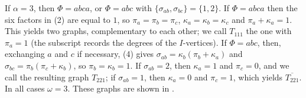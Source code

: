 \documentclass[11pt]{article}
\begin{document}
If $\alpha=3$, then $\Phi=abca$, or $\Phi=abc$ with $\{\sigma_{ab},\sigma_{bc}\}=\{1,2\}$. If $\Phi=abca$ then the six factors in (2) are equal to $1$, so $\pi_a=\pi_b=\pi_c$, $\kappa_a=\kappa_b=\kappa_c$ and $\pi_a+\kappa_a=1$. This yields two graphs, complementary to each other; we call $T_{111}$ the one with $\pi_a=1$ (the subscript records the degrees of the $I$-vertices). If $\Phi=abc$, then, exchanging $a$ and $c$ if necessary, (4) gives $\sigma_{ab}=\kappa_b(\pi_b+\kappa_a)$ and $\sigma_{bc}=\pi_b(\pi_c+\kappa_b)$, so $\pi_b=\kappa_b=1$. If $\sigma_{ab}=2$, then $\kappa_a=1$ and $\pi_c=0$, and we call the resulting graph $T_{221}$; if $\sigma_{ab}=1$, then $\kappa_a=0$ and $\pi_c=1$, which yields $\overline{T_{221}}$. In all cases $\omega=3$. These graphs are shown in .
\end{document}

